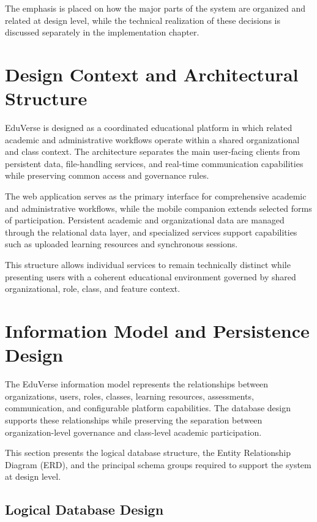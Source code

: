 The emphasis is placed on how the major parts of the system are organized and
related at design level, while the technical realization of these decisions is
discussed separately in the implementation chapter.

\section{Design Context and Architectural Structure}\label{sec:architectural_design_overview}

EduVerse is designed as a coordinated educational platform in which related
academic and administrative workflows operate within a shared organizational
and class context. The architecture separates the main user-facing clients
from persistent data, file-handling services, and real-time communication
capabilities while preserving common access and governance rules.

The web application serves as the primary interface for comprehensive academic
and administrative workflows, while the mobile companion extends selected
forms of participation. Persistent academic and organizational data are
managed through the relational data layer, and specialized services support
capabilities such as uploaded learning resources and synchronous sessions.

This structure allows individual services to remain technically distinct while
presenting users with a coherent educational environment governed by shared
organizational, role, class, and feature context.

\section{Information Model and Persistence Design}\label{sec:data_and_storage_design}

The EduVerse information model represents the relationships between
organizations, users, roles, classes, learning resources, assessments,
communication, and configurable platform capabilities. The database design
supports these relationships while preserving the separation between
organization-level governance and class-level academic participation.

This section presents the logical database structure, the Entity Relationship
Diagram (ERD), and the principal schema groups required to support the system
at design level.

\subsection{Logical Database Design}\label{subsec:database_design_overview}

